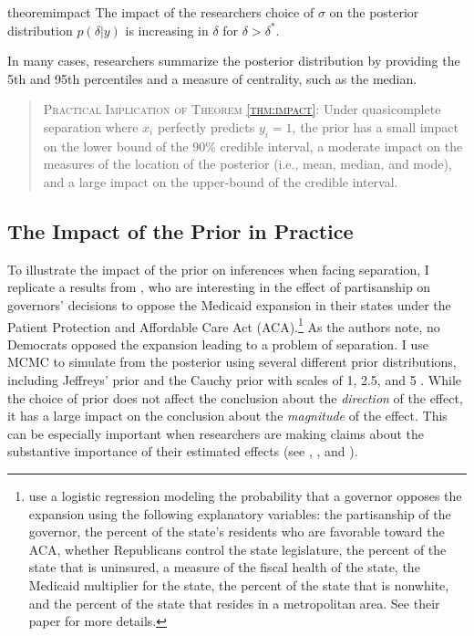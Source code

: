 \documentclass[12pt]{article}
\begin{document}
\begin{restatable}{theorem}{impact}\label{thm:impact}
The impact of the researchers choice of $\sigma$ on the posterior distribution $p(\delta | y)$ is increasing in $\delta$ for $\delta> \delta^*$. 
\end{restatable}

In many cases, researchers summarize the posterior distribution by providing the 5th and 95th percentiles and a measure of centrality, such as the median.

\begin{quote}
\textsc{Practical Implication of Theorem \ref{thm:impact}:} Under quasicomplete separation where $x_i$ perfectly predicts $y_i = 1$, the prior has a small impact on the lower bound of the 90\% credible interval, a moderate impact on the measures of the location of the posterior (i.e., mean, median, and mode), and a large impact on the upper-bound of the credible interval.
\end{quote}

\subsection*{The Impact of the Prior in Practice}

To illustrate the impact of the prior on inferences when facing separation, I replicate a results from \cite{BarrilleauxRainey2014}, who are interesting in the effect of partisanship on governors' decisions to oppose the Medicaid expansion in their states under the Patient Protection and Affordable Care Act (ACA).\footnote{\cite{BarrilleauxRainey2014} use a logistic regression modeling the probability that a governor opposes the expansion using the following explanatory variables: the partisanship of the governor, the percent of the state's residents who are favorable toward the ACA, whether Republicans control the state legislature, the percent of the state that is uninsured, a measure of the fiscal health of the state, the Medicaid multiplier for the state, the percent of the state that is nonwhite, and the percent of the state that resides in a metropolitan area. See their paper for more details.} As the authors note, no Democrats opposed the expansion leading to a problem of separation. I use MCMC to simulate from the posterior using several different prior distributions, including Jeffreys' prior \citep{Zorn2005} and the Cauchy prior with scales of 1, 2.5, and 5 \citep{Gelmanetal2008}. While the choice of prior does not affect the conclusion about the \emph{direction} of the effect, it has a large impact on the conclusion about the \emph{magnitude} of the effect. This can be especially important when researchers are making claims about the substantive importance of their estimated effects (see \citealt{Rainey2014}, \citealt{Gross2014}, and \citealt{McCaskeyRainey2014}).
\end{document}
